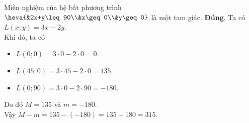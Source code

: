 \begin{ex}
{\begin{itemchoice}
\begin{center}
\begin{tikzpicture}[scale=1, font=\footnotesize, line join=round, line cap=round, >=stealth]
					

				\end{tikzpicture}
			\end{center} Miền nghiệm của hệ bất phương trình $\heva{&2x+y\leq 90\\&x\geq 0\\&y\geq0}$ là một tam giác.
			\itemch \textbf{Đúng}. Ta có $L(x;y)=3x-2y$.\\Khi đó, ta có
			\begin{itemize}
				\item $L(0;0)=3\cdot0-2\cdot0=0$.
				\item $L(45;0)=3\cdot45-2\cdot0=135$.
				\item $L(0;90)=3\cdot0-2\cdot90=-180$.
			\end{itemize}
			Do đó $M=135$ và $m=-180$.\\ Vậy $M-m=135-(-180)=135+180=315$.
		\end{itemchoice}
	}
\end{ex}

